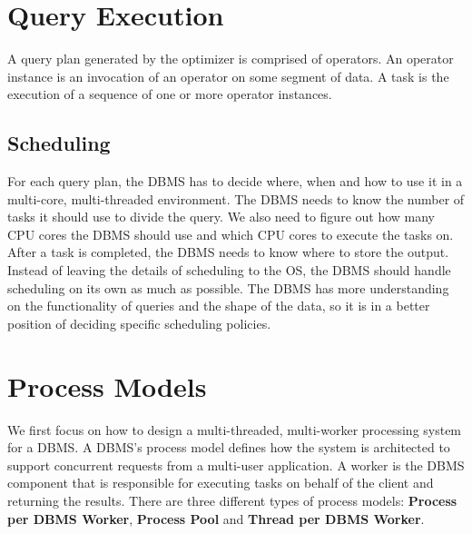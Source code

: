 \documentclass[11pt]{article}
\begin{document}
\maketitle
\thispagestyle{plain}

\section{Query Execution}
A query plan generated by the optimizer is comprised of operators. An operator instance is an invocation of an operator on some segment of data. A task is the execution of a sequence of one or more operator instances.

\subsection*{Scheduling} 
For each query plan, the DBMS has to decide where, when and how to use it in a multi-core, multi-threaded environment. The DBMS needs to know the number of tasks it should use to divide the query. We also need to figure out how many CPU cores the DBMS should use and which CPU cores to execute the tasks on. After a task is completed, the DBMS needs to know where to store the output. Instead of leaving the details of scheduling to the OS, the DBMS should handle scheduling on its own as much as possible. The DBMS has more understanding on the functionality of queries and the shape of the data, so it is in a better position of deciding specific scheduling policies.

\section{Process Models}
We first focus on how to design a multi-threaded, multi-worker processing system for a DBMS. A DBMS's process model defines how the system is architected to support concurrent requests from a multi-user application. A worker is the DBMS component that is responsible for executing tasks on behalf of the client and returning the results. There are three different types of process models: \textbf{Process per DBMS Worker}, \textbf{Process Pool} and \textbf{Thread per DBMS Worker}.
\end{document}
